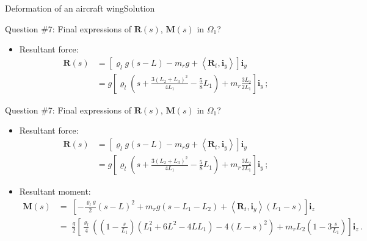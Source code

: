 \documentclass{beamer}
\newcommand{\yj}{y}
\newcommand{\zj}{z}
\renewcommand{\ij}{i}
\newcommand{\iv}{{\boldsymbol\ij}}
\newcommand{\medium}{\Omega}
\newcommand{\roi}{\varrho}
\newcommand{\Fresj}{R}
\newcommand{\Mresj}{M}
\newcommand{\Fres}{{\boldsymbol\Fresj}}
\newcommand{\Mres}{{\boldsymbol\Mresj}}
\newcommand{\scal}[1]{\left\langle{#1}\right\rangle}
\begin{document}
\begin{frame}{Deformation of an aircraft wing}{Solution}

\begin{overprint}

\vskip-20pt
\begin{exampleblock}{Question \#7: Final expressions of $\Fres(s)$, $\Mres(s)$ in $\medium_1$?}
\begin{itemize}
\item Resultant force:
\begin{displaymath}
\begin{split}
\Fres(s) &=\left[\roi_l g(s-L)-m_r g+\scal{\Fres_t,\iv_\yj}\right]\iv_\yj \\
&=g\left[\roi_l\left(s+\frac{3(L_2+L_3)^2}{4L_1}-\frac{5}{8}L_1\right)+m_r\frac{3L_2}{2L_1}\right]\iv_\yj\,;
\end{split}
\end{displaymath}
\end{itemize}
\end{exampleblock}

\vskip-20pt
\begin{exampleblock}{Question \#7: Final expressions of $\Fres(s)$, $\Mres(s)$ in $\medium_1$?}
\begin{itemize}
\item Resultant force:
\begin{displaymath}
\begin{split}
\Fres(s) &=\left[\roi_l g(s-L)-m_r g+\scal{\Fres_t,\iv_\yj}\right]\iv_\yj \\
&=g\left[\roi_l\left(s+\frac{3(L_2+L_3)^2}{4L_1}-\frac{5}{8}L_1\right)+m_r\frac{3L_2}{2L_1}\right]\iv_\yj\,;
\end{split}
\end{displaymath}
\item Resultant moment:
\begin{displaymath}
\begin{split}
\!\!\!\!\!\!\!\!\!\!\!\!\!\Mres(s) &= \scriptstyle\; \left[-\frac{\roi_l g}{2}(s-L)^2 + m_r g(s-L_1-L_2) + \scal{\Fres_t,\iv_\yj}(L_1-s)\right]\iv_\zj  \\
&= \scriptstyle\; \frac{g}{2}\left[\frac{\roi_l}{4}\left((1-\frac{s}{L_1})(L_1^2+6L^2-4LL_1)-4(L-s)^2\right) + m_rL_2\left(1-3\frac{s}{L_1}\right)\right]\iv_\zj \,.
\end{split}
\end{displaymath}
\end{itemize}
\end{exampleblock}

\end{overprint}

\end{frame}
\end{document}

